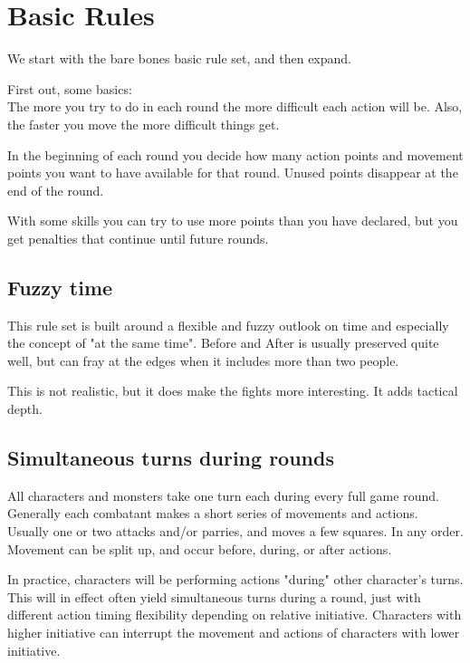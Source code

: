 
\section*{Basic Rules}

We start with the bare bones basic rule set, and then expand.

First out, some basics: \\
The more you try to do in each round the more difficult each action will be. Also, the faster you move the more difficult things get.

In the beginning of each round you decide how many action points and movement points you want to have available for that round. Unused points disappear at the end of the round.

With some skills you can try to use more points than you have declared, but you get penalties that continue until future rounds.


\subsection*{Fuzzy time}
This rule set is built around a flexible and fuzzy outlook on time and especially the concept of "at the same time". Before and After is usually preserved quite well, but can fray at the edges when it includes more than two people.

This is not realistic, but it does make the fights more interesting. It adds tactical depth.


\subsection*{Simultaneous turns during rounds}
All characters and monsters take one turn each during every full game round. Generally each combatant makes a short series of movements and actions. Usually one or two attacks and/or parries, and moves a few squares. In any order. Movement can be split up, and occur before, during, or after actions.

In practice, characters will be performing actions "during" other character's turns. This will in effect often yield simultaneous turns during a round, just with different action timing flexibility depending on relative initiative. Characters with higher initiative can interrupt the movement and actions of characters with lower initiative.


